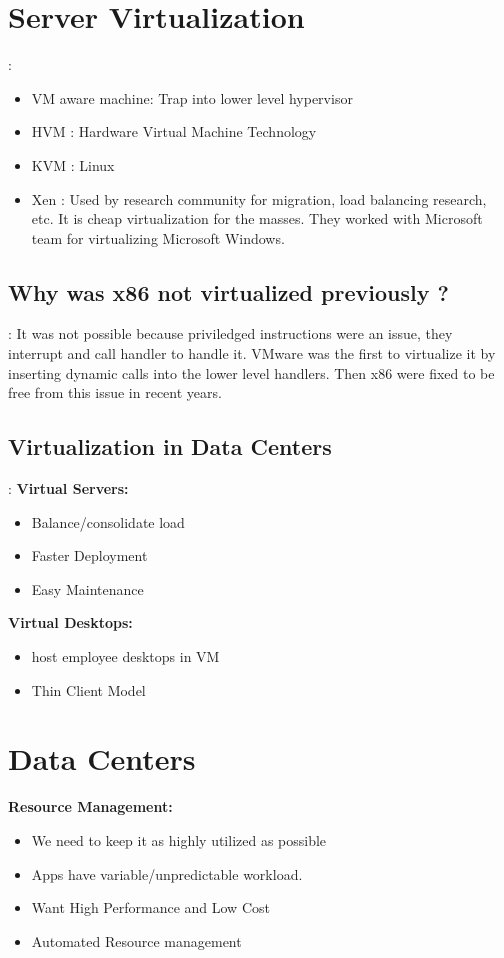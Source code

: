 \documentclass[twoside]{article}
\begin{document}
\section{Server Virtualization}:
\begin{itemize}
  \item VM aware machine: Trap into lower level hypervisor
  \item HVM : Hardware Virtual Machine Technology
  \item KVM : Linux
  \item Xen : Used by research community for migration, load balancing research, etc. It is cheap virtualization for the masses. They worked with Microsoft team for virtualizing Microsoft Windows.
\end{itemize}

\subsection{Why was x86 not virtualized previously ?}:
It was not possible because priviledged instructions were an issue, they interrupt and call handler to handle it. VMware was the first to virtualize it by inserting dynamic calls into the lower level handlers. Then x86 were fixed to be free from this issue in recent years.

\subsection{Virtualization in Data Centers}:
\textbf{Virtual Servers:} 
\begin{itemize}
  \item Balance/consolidate load
  \item Faster Deployment
  \item Easy Maintenance
 
\end{itemize}


\textbf{Virtual Desktops:} 
\begin{itemize}
  \item host employee desktops in VM
  \item Thin Client Model
\end{itemize}


\section{Data Centers}
\textbf{Resource Management:} 
\begin{itemize}
  \item We need to keep it as highly utilized as possible
  \item Apps have variable/unpredictable workload.
  \item Want High Performance and Low Cost
  \item Automated Resource management
\end{itemize}
\end{document}
